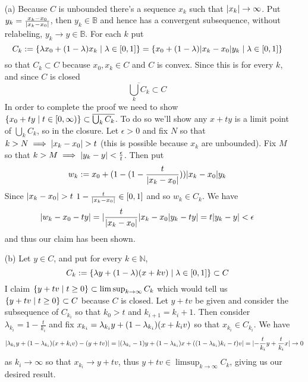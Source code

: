 \documentclass{article}
\newenvironment{ex}[1]
  {\renewcommand\theexercise{#1}\exercise}
  {\endexercise}
\newcommand{\B}{\mathbb{B}}
\newcommand{\clo}[1]{\overline{#1}}
\begin{document}
\begin{ex}{4.8} %
  \,\\
  \begin{enumerate}
    \item[(a)]
      Because $C$ is unbounded there's a sequence $x_k$ such that $\lvert x_k\rvert \to \infty$. Put $y_k = \frac{x_k - x_0}{\lvert x_k - x_0\rvert}$, then $y_k \in \B$ and hence has a convergent subsequence, without relabeling, $y_k \to y \in \B$. For each $k$ put
      $$
      C_k := \{ \lambda x_0 + (1-\lambda)x_{k} \mid \lambda \in [0, 1] \} = \{ x_0 + (1-\lambda)\lvert x_{k} - x_0\rvert y_{k} \mid \lambda \in [0, 1] \}
      $$
      so that $C_k \subset C$ because $x_0, x_{k} \in C$ and $C$ is convex. Since this is for every $k$, and since $C$ is closed
      $$
      \clo{\bigcup_k C_k} \subset C
      $$
      In order to complete the proof we need to show $\braces{ x_0 + ty \mid t \in [0, \infty) } \subset \clo{\bigcup_k C_k}$. To do so we'll show any $x + ty$ is a limit point of $\bigcup_k C_k$, so in the closure. Let $\epsilon > 0$ and fix $N$ so that $k>N \implies \lvert x_k - x_0\rvert > t$ (this is possible because $x_k$ are unbounded). Fix $M$ so that $k > M \implies \lvert y_k - y\rvert < \frac{\epsilon}{t}$. Then put
      $$
      w_k := x_0 + (1 - (1 - \frac{t}{\lvert x_k - x_0\rvert}))\lvert x_k - x_0\rvert y_k
      $$
      Since $\lvert x_k - x_0\rvert > t$ $1 - \frac{t}{\lvert x_k - x_0\rvert} \in [0, 1]$ and so $w_k \in C_k$. We have
      $$
      \lvert w_k - x_0 - ty\rvert = \lvert\frac{t}{\lvert x_k - x_0\rvert}\lvert x_k - x_0\rvert y_k - ty\rvert = t \lvert y_k - y\rvert < \epsilon
      $$
      and thus our claim has been shown.
    \item[(b)]
      Let $y \in C$, and put for every $k \in \mathbb{N}$,
      $$
      C_k := \{ \lambda y + (1-\lambda) (x + kv) \mid \lambda \in [0, 1] \} \subset C
      $$
      I claim $\{ y + tv \mid t \ge 0 \} \subset \limsup_{k \to \infty} C_k$ which would tell us $\{ y + tv \mid t \ge 0 \} \subset C$ because $C$ is closed. Let $y + tv$ be given and consider the subsequence of $C_{k_i}$ so that $k_0 > t$ and $k_{i+1} = k_{i} + 1$. Then consider $\lambda_{k_i} = 1 - \frac{t}{k_i}$ and fix $x_{k_i} = \lambda_{k_i} y + (1 - \lambda_{k_i}) (x + k_i v)$ so that $x_{k_i} \in C_{k_i}$. We have
      $$
      \lvert\lambda_{k_i} y + (1 - \lambda_{k_i}) (x + k_i v) - (y + tv)\rvert = \lvert (\lambda_{k_i} - 1) y + (1-\lambda_{k_i}) x + ((1-\lambda_{k_i})k_i - t)v \rvert = \lvert-\frac{t}{k_i} y + \frac{t}{k_i} x\rvert \to 0
      $$
      as $k_i \to \infty$ so that $x_{k_i} \to y + tv$, thus $y + tv \in \limsup_{k \to \infty} C_k$, giving us our desired result.
  \end{enumerate}
\end{ex} %
\end{document}
